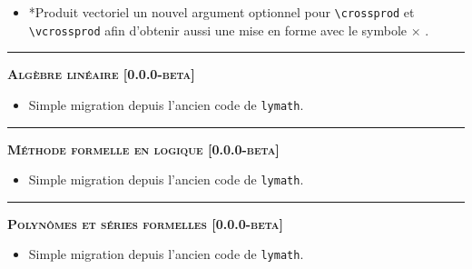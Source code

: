 \documentclass[12pt,a4paper]{book}
\makeatletter
\newcommand\env[1]{\texttt{#1}}
\newcommand\macro[1]{\env{\textbackslash{}#1}}
\theoremstyle{definition}
\newcommand\separation{
	\medskip
	\hfill\rule{0.5\textwidth}{0.75pt}\hfill
	\medskip
}
\newcommand\topic{\@ifstar{\@topic@star}{\@topic@no@star}}
\newcommand\@topic@no@star[1]{%
	\textbf{\textsc{#1}.}%
}
\newcommand\@topic@star[1]{%
	\textbf{\textsc{#1} :}%
}
\makeatother
\begin{document}
{{\begin{description}
\begin{itemize}[itemsep=.5em]
    
    	
    
    
        \item \topic*{Produit vectoriel}
              un nouvel argument optionnel pour \macro{crossprod} et \macro{vcrossprod} afin d'obtenir aussi une mise en forme avec le symbole $\times$ .
    
    
        
    \end{itemize}
    
    
    \separation
    
    
    
    
    \begin{center}
        \textbf{\textsc{Algèbre linéaire [0.0.0-beta]}}
    \end{center}
    
    \begin{itemize}[itemsep=.5em]
        \item Simple migration depuis l'ancien code de \verb+lymath+.
    \end{itemize}
    
    
    \separation
    
    
    
    
    \begin{center}
        \textbf{\textsc{Méthode formelle en logique [0.0.0-beta]}}
    \end{center}
    
    \begin{itemize}[itemsep=.5em]
        \item Simple migration depuis l'ancien code de \verb+lymath+.
    \end{itemize}
    
    
    \separation
    
    
    
    
    \begin{center}
        \textbf{\textsc{Polynômes et séries formelles [0.0.0-beta]}}
    \end{center}
    
    \begin{itemize}[itemsep=.5em]
        \item Simple migration depuis l'ancien code de \verb+lymath+.
    \end{itemize}
    

\end{description}}}
\end{document}
